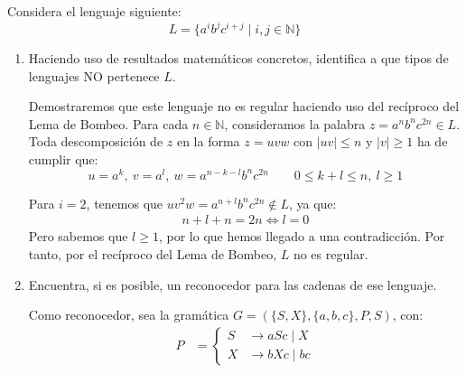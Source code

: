 \begin{ejercicio}\label{ej:1.5.5}
    Considera el lenguaje siguiente:
    \begin{equation*}
        L = \{a^ib^jc^{i+j}\mid i,j\in \mathbb{N}\}
    \end{equation*}
    \begin{enumerate}
        \item Haciendo uso de resultados matemáticos concretos, identifica a que tipos de lenguajes NO pertenece $L$.
        
        Demostraremos que este lenguaje no es regular haciendo uso del recíproco del Lema de Bombeo. Para cada $n\in \mathbb{N}$, consideramos la palabra $z=a^nb^nc^{2n}\in L$. Toda descomposición de $z$ en la forma $z=uvw$ con $|uv|\leq n$ y $|v|\geq 1$ ha de cumplir que:
        \begin{equation*}
            u=a^k,\ v=a^l,\ w=a^{n-k-l}b^nc^{2n}\qquad 0\leq k+l\leq n,\ l\geq 1
        \end{equation*}

        Para $i=2$, tenemos que $uv^2w = a^{n+l}b^nc^{2n}\notin L$, ya que:
        \begin{align*}
            n+l+n = 2n\Longleftrightarrow l=0
        \end{align*}
        Pero sabemos que $l\geq 1$, por lo que hemos llegado a una contradicción. Por tanto, por el recíproco del Lema de Bombeo, $L$ no es regular.
        \item Encuentra, si es posible, un reconocedor para las cadenas de ese lenguaje.
        
        Como reconocedor, sea la gramática $G=(\{S,X\},\{a,b,c\},P,S)$, con:
        \begin{align*}
            P &= \left\{
                \begin{aligned}
                    S &\rightarrow aSc\mid X \\
                    X &\rightarrow bXc\mid bc
                \end{aligned}
            \right.
        \end{align*}
    \end{enumerate}
\end{ejercicio}

